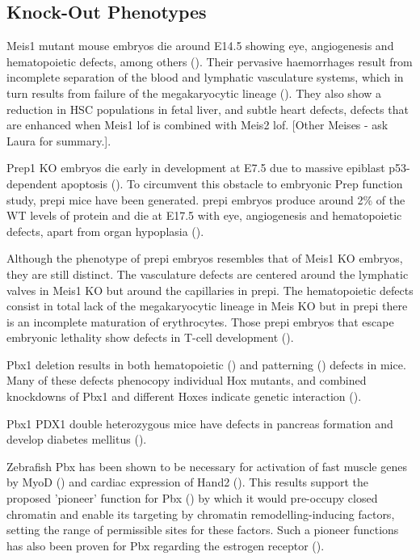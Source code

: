 \subsection{Knock-Out Phenotypes}

Meis1 mutant mouse embryos die around E14.5 showing eye, angiogenesis and hematopoietic defects, among others (\cite{Hisa2004, Azcoitia2005}). Their pervasive haemorrhages result from incomplete separation of the blood and lymphatic vasculature systems, which in turn results from failure of the megakaryocytic lineage (\cite{Carramolino2010}). They also show a reduction in \ac{HSC} populations in fetal liver, and subtle heart defects, defects that are enhanced when Meis1 \ac{lof} is combined with Meis2 \ac{lof}. [Other Meises - ask Laura for summary.]. 

Prep1 \ac{KO} embryos die early in development at E7.5 due to massive epiblast p53-dependent apoptosis (\cite{Fernandez-Diaz2010}). To circumvent this obstacle to embryonic Prep function study, \ac{prepi} mice have been generated. \ac{prepi} embryos produce around 2\% of the \ac{WT} levels of protein and die at E17.5 with eye, angiogenesis and hematopoietic defects, apart from organ hypoplasia (\cite{Ferretti2006, DiRosa2007}).  

Although the phenotype of \ac{prepi} embryos resembles that of Meis1 \ac {KO} embryos, they are still distinct. The vasculature defects are centered around the lymphatic valves in Meis1 \ac{KO} but around the capillaries in \ac{prepi}. The hematopoietic defects consist in total lack of the megakaryocytic lineage in Meis \ac{KO} but in  \ac{prepi} there is an incomplete maturation of erythrocytes. Those \ac{prepi} embryos that escape embryonic lethality show defects in T-cell development (\cite{Penkov2005}). 

Pbx1 deletion results in both hematopoietic (\cite{DiMartino2001}) and patterning (\cite{Selleri2001, Moens2006}) defects in mice. Many of these defects phenocopy individual Hox mutants, and combined knockdowns of Pbx1 and different Hoxes indicate genetic interaction (\cite{Moens2006}).

Pbx1 PDX1 double heterozygous mice have defects in pancreas formation and develop diabetes mellitus (\cite{Kim2002}). 

Zebrafish Pbx has been shown to be necessary for activation of fast muscle genes by MyoD (\cite{Maves2007}) and cardiac expression of Hand2 (\cite{Maves2009}). This results support the proposed 'pioneer' function for Pbx (\cite{Berkes2004}) by which it would pre-occupy closed chromatin and enable its targeting by chromatin remodelling-inducing factors, setting the range of permissible sites for these factors. Such a pioneer functions has also been proven for Pbx regarding the estrogen receptor (\cite{Magnani2011}). %


